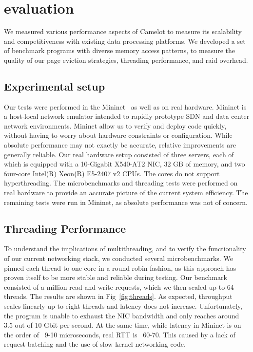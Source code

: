 \section{evaluation}
\label{sec:eval}

We measured various performance aspects of Camelot to measure its
scalability and competitiveness with existing data processing
platforms. We developed a set of benchmark programs with diverse
memory access patterns, to measure the quality of our page eviction
strategies, threading performance, and raid overhead.

\subsection{Experimental setup}
Our tests were performed in the Mininet~\cite{mininet} as well as on real hardware.
Mininet is a host-local network emulator intended to rapidly prototype SDN and data center network environments. Mininet allow us to verify and deploy code quickly, without having to worry about hardware constraints or configuration. While absolute performance may not exactly be accurate, relative improvements are generally reliable. 
Our real hardware setup consisted of three servers, each of which is equipped with a 10-Gigabit X540-AT2 NIC, 32 GB of memory, and two four-core Intel(R) Xeon(R) E5-2407 v2 CPUs. The cores do not support hyperthreading.
The microbenchmarks and threading tests were performed on real hardware to provide an accurate picture of the current system efficiency. The remaining tests were run in Mininet, as absolute performance was not of concern.

\subsection{Threading Performance}
To understand the implications of multithreading, and to verify the functionality of our current networking stack, we conducted several microbenchmarks. We pinned each thread to one core in a round-robin fashion, as this approach has proven itself to be more stable and reliable during testing. Our benchmark consisted of a million read and write requests, which we then scaled up to 64 threads. The results are shown in Fig~\ref{fig:threads}.
As expected, throughput scales linearly up to eight threads and latency does not increase. Unfortunately, the program is unable to exhaust the NIC bandwidth and only reaches around 3.5 out of 10 Gbit per second. At the same time, while latency in Mininet is on the order of ~9-10 microseconds, real RTT is ~60-70. This caused by a lack of request batching and the use of slow kernel networking code.

